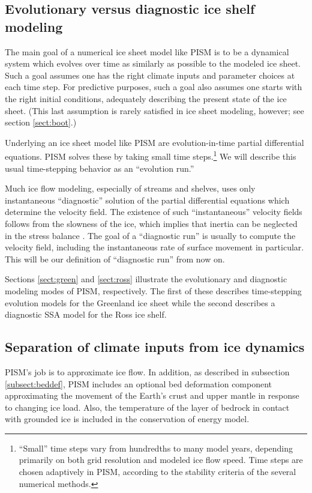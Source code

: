 \documentclass[11pt,final]{amsart}
\begin{document}
\subsection{Evolutionary versus diagnostic ice shelf modeling} \label{subsect:basicmodes}    The main goal of a numerical ice sheet model like PISM is to be a dynamical system which evolves over time as similarly as possible to the modeled ice sheet.  Such a goal assumes one has the right climate inputs and parameter choices at each time step.  For predictive purposes, such a goal also assumes one starts with the right initial conditions, adequately describing the present state of the ice sheet.  (This last assumption is rarely satisfied in ice sheet modeling, however; see section \ref{sect:boot}.)

Underlying an ice sheet model like PISM are evolution-in-time partial differential equations.  PISM solves these by taking small time steps.\footnote{``Small'' time steps vary from hundredths to many model years, depending primarily on both grid resolution and modeled ice flow speed.  Time steps are chosen adaptively in PISM, according to the stability criteria of the several numerical methods.}  We will describe this usual time-stepping behavior as an ``evolution run.''

Much ice flow modeling, especially of streams and shelves, uses only instantaneous ``diagnostic'' solution of the partial differential equations which determine the velocity field.  The existence of such ``instantaneous'' velocity fields follows from the slowness of the ice, which implies that inertia can be neglected in the stress balance \cite{Fowler}.  The goal of a ``diagnostic run'' is usually to compute the velocity field, including the instantaneous rate of surface movement in particular.  This will be our definition of ``diagnostic run'' from now on.

Sections \ref{sect:green} and \ref{sect:ross} illustrate the evolutionary and diagnostic modeling modes of PISM, respectively.  The first of these describes time-stepping evolution models for the Greenland ice sheet while the second describes a diagnostic SSA model for the Ross ice shelf.


\subsection{Separation of climate inputs from ice dynamics}\label{subsect:separateclimate}  
PISM's job is to approximate ice flow.  In addition, as described in subsection \ref{subsect:beddef}, PISM includes an optional bed deformation component approximating the movement of the Earth's crust and upper mantle in response to changing ice load.  Also, the temperature of the layer of bedrock in contact with grounded ice is included in the conservation of energy model.
\end{document}
